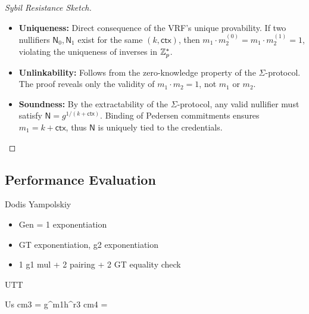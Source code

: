 \begin{proof}[Sybil Resistance Sketch]
\begin{itemize}
    \item \textbf{Uniqueness:} Direct consequence of the VRF’s unique provability. If two nullifiers $\textsf{N}_0, \textsf{N}_1$ exist for the same $(k, \textsf{ctx})$, then $m_1 \cdot m_2^{(0)} = m_1 \cdot m_2^{(1)} = 1$, violating the uniqueness of inverses in $\mathbb{Z}_p^*$.
    
    \item \textbf{Unlinkability:} Follows from the zero-knowledge property of the $\Sigma$-protocol. The proof reveals only the validity of $m_1 \cdot m_2 = 1$, not $m_1$ or $m_2$.
    
    \item \textbf{Soundness:} By the extractability of the $\Sigma$-protocol, any valid nullifier must satisfy $\textsf{N} = g^{1/(k + \textsf{ctx})}$. Binding of Pedersen commitments ensures $m_1 = k + \textsf{ctx}$, thus $\textsf{N}$ is uniquely tied to the credentials.
\end{itemize}
\end{proof}


\subsection{Performance Evaluation}

Dodis Yampolskiy
\begin{itemize}
    \item Gen = 1 exponentiation 
    \item GT exponentiation, g2 exponentiation 
    \item 1 g1 mul + 2 pairing + 2 GT equality check
\end{itemize}

UTT


Us
cm3 = g^m1h^r3
cm4 = 



















































